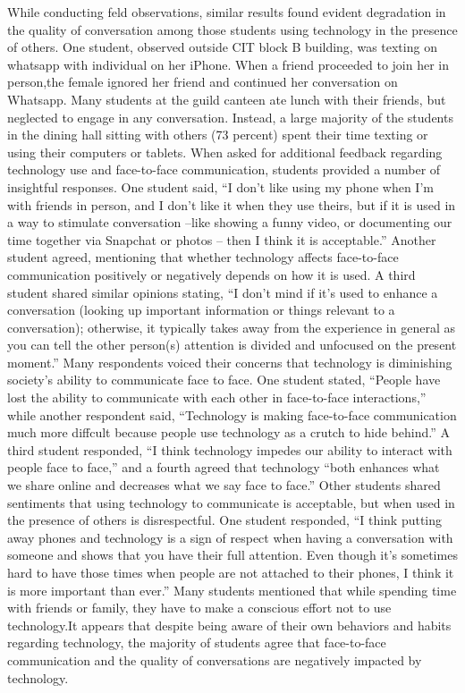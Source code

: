 \documentclass[11pt]{article} %
\begin{document}
\newline While conducting feld observations, similar results found evident degradation in the quality of conversation among those students using technology in the presence of others. One student, observed outside CIT block B building, was texting on whatsapp with individual on her iPhone. When a friend proceeded to join her in person,the female ignored her friend and continued her conversation on Whatsapp. Many students at the guild canteen ate lunch with their friends, but neglected to engage in any conversation. Instead, a large majority of the students in the dining hall sitting with others (73 percent) spent their time texting or using their computers or tablets. 
\newline When asked for additional feedback regarding technology use and face-to-face communication, students provided a number of insightful responses. One student said, “I don’t like using my phone when I’m with friends in person, and I don’t like it when they use theirs, but if it is used in a way to stimulate conversation –like showing a funny video, or documenting our time together via Snapchat or photos – then I think it is acceptable.” Another student agreed, mentioning that whether technology affects face-to-face communication positively or negatively depends on how it is used. A third student shared similar opinions stating, “I don’t mind if it’s used to enhance a conversation (looking up important information or things relevant to a conversation); otherwise, it typically takes away from the experience in general as you can tell the other person(s) attention is divided and unfocused on the present moment.” 
Many respondents voiced their concerns that technology is diminishing society’s ability to communicate face to face. One student stated, “People have lost the ability to communicate with each other in face-to-face interactions,” while another respondent said, “Technology is making face-to-face communication much more diffcult because people use technology as a crutch to hide behind.” 
A third student responded, “I think technology impedes our ability to interact with people face to face,” and a fourth agreed that technology “both enhances what we share online and decreases what we say face to face.”
\newline Other students shared sentiments that using technology to communicate is acceptable, but when used in the presence of others is disrespectful. One student responded, “I think putting away phones and technology is a sign of respect when having a conversation with someone and shows that you have their full attention. Even though it’s sometimes hard to have those times when people are not attached to their phones, I think it is more important than ever.” Many students mentioned that while spending time with friends or family, they have to make a conscious effort not to use technology.It appears that despite being aware of their own behaviors and habits regarding technology, the majority of students agree that face-to-face communication and the quality of conversations are negatively impacted by technology.
\end{document}
